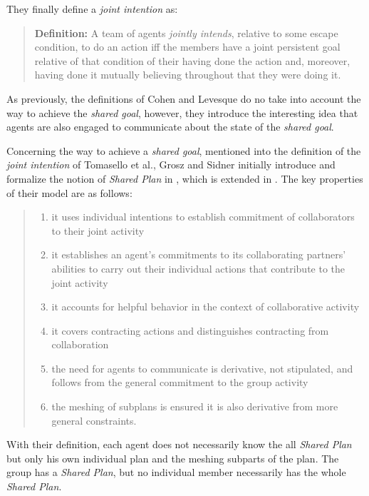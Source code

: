 \documentclass[english,a4paper,11pt,twoside]{StyleThese}
\begin{document}
They finally define a \textit{joint intention} as:
\begin{quote}
\textbf{Definition:} A team of agents \textit{jointly intends}, relative to some escape condition, to do an action iff the members have a joint persistent goal relative of that condition of their having done the action and, moreover, having done it mutually believing throughout that they were doing it.
\end{quote}

As previously, the definitions of Cohen and Levesque do no take into account the way to achieve the \textit{shared goal}, however, they introduce the interesting idea that agents are also engaged to communicate about the state of the \textit{shared goal}.

Concerning the way to achieve a \textit{shared goal}, mentioned into the definition of the \textit{joint intention} of Tomasello et al., Grosz and Sidner initially introduce and formalize the notion of \textit{Shared Plan} in \cite{grosz1988plans}, which is extended in \cite{grosz1999evolution}. The key properties of their model are as follows:
\begin{quote}
\begin{enumerate}
\item it uses individual intentions to establish commitment of collaborators to their joint activity
\item it establishes an agent's commitments to its collaborating partners' abilities to carry out their
individual actions that contribute to the joint activity
\item it accounts for helpful behavior in the context of collaborative activity
\item it covers contracting actions and distinguishes contracting from collaboration
\item the need for agents to communicate is derivative, not stipulated, and follows from the general
commitment to the group activity
\item the meshing of subplans is ensured it is also derivative from more general constraints.
\end{enumerate}
\end{quote}

With their definition, each agent does not necessarily know the all \textit{Shared Plan} but only his own individual plan and the meshing subparts of the plan. The group has a \textit{Shared Plan}, but no individual member necessarily has the whole \textit{Shared Plan}.
\end{document}
